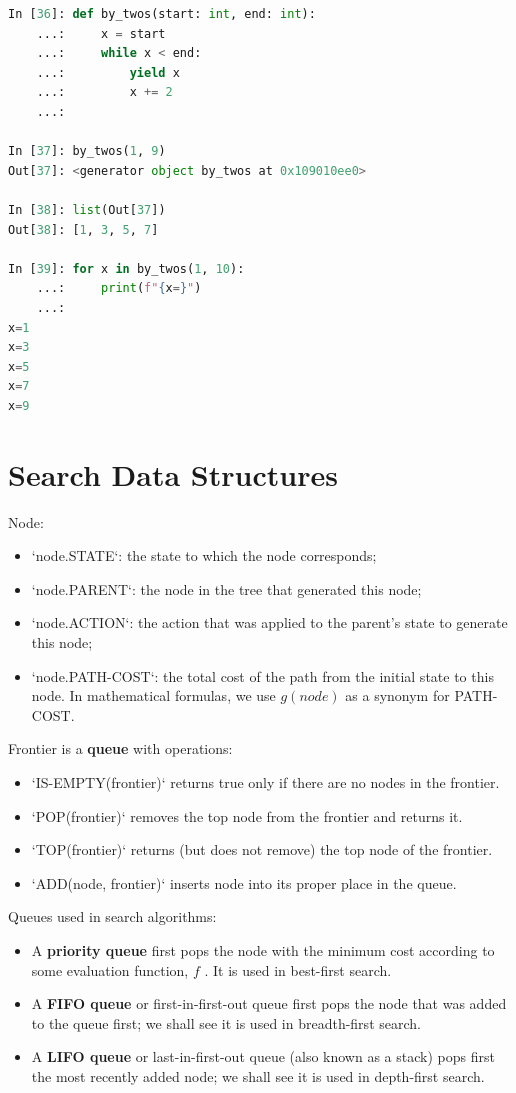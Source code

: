 \documentclass[11pt]{article}
\begin{document}
\begin{lstlisting}[language=Python,numbers=none]
In [36]: def by_twos(start: int, end: int):
    ...:     x = start
    ...:     while x < end:
    ...:         yield x
    ...:         x += 2
    ...:

In [37]: by_twos(1, 9)
Out[37]: <generator object by_twos at 0x109010ee0>

In [38]: list(Out[37])
Out[38]: [1, 3, 5, 7]

In [39]: for x in by_twos(1, 10):
    ...:     print(f"{x=}")
    ...:
x=1
x=3
x=5
x=7
x=9
\end{lstlisting}
\section{Search Data Structures}
\label{sec:org105587d}

Node:

\begin{itemize}
\item `node.STATE`: the state to which the node corresponds;
\item `node.PARENT`: the node in the tree that generated this node;
\item `node.ACTION`: the action that was applied to the parent’s state to generate this node;
\item `node.PATH-COST`: the total cost of the path from the initial state to this node. In mathematical formulas, we use \(g(node)\) as a synonym for PATH-COST.
\end{itemize}

Frontier is a \textbf{queue} with operations:

\begin{itemize}
\item `IS-EMPTY(frontier)` returns true only if there are no nodes in the frontier.
\item `POP(frontier)` removes the top node from the frontier and returns it.
\item `TOP(frontier)` returns (but does not remove) the top node of the frontier.
\item `ADD(node, frontier)` inserts node into its proper place in the queue.
\end{itemize}

Queues used in search algorithms:

\begin{itemize}
\item A \textbf{priority queue} first pops the node with the minimum cost according to some evaluation function, \(f\) . It is used in best-first search.
\item A \textbf{FIFO queue} or first-in-first-out queue first pops the node that was added to the queue first; we shall see it is used in breadth-first search.
\item A \textbf{LIFO queue} or last-in-first-out queue (also known as a stack) pops first the most recently added node; we shall see it is used in depth-first search.
\end{itemize}
\end{document}

